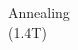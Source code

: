 \documentclass[preview]{standalone}
\begin{document}
\begin{center}
Annealing\\(1.4T)
\end{center}
\end{document}
